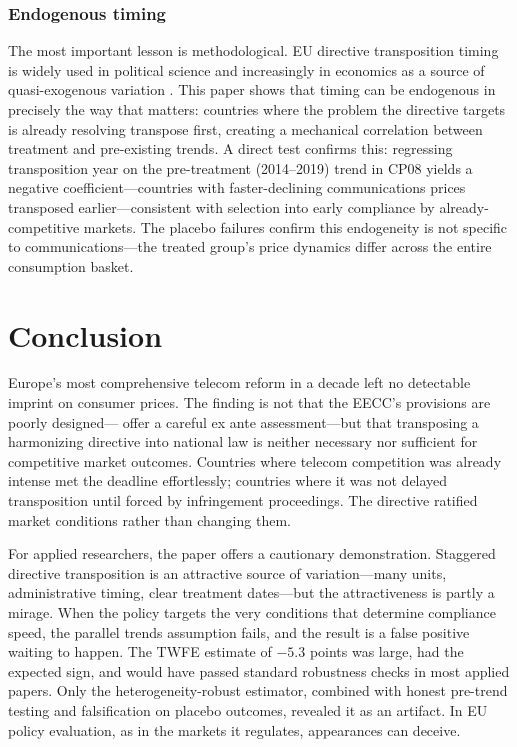 \documentclass[12pt]{article}
\begin{document}
\subsubsection*{Endogenous timing} The most important lesson is methodological. EU directive transposition timing is widely used in political science and increasingly in economics as a source of quasi-exogenous variation \citep{konig2006domestic, thomann2019customizing}. This paper shows that timing can be endogenous in precisely the way that matters: countries where the problem the directive targets is already resolving transpose first, creating a mechanical correlation between treatment and pre-existing trends. A direct test confirms this: regressing transposition year on the pre-treatment (2014--2019) trend in CP08 yields a negative coefficient---countries with faster-declining communications prices transposed earlier---consistent with selection into early compliance by already-competitive markets. The placebo failures confirm this endogeneity is not specific to communications---the treated group's price dynamics differ across the entire consumption basket.

\section{Conclusion}

Europe's most comprehensive telecom reform in a decade left no detectable imprint on consumer prices. The finding is not that the EECC's provisions are poorly designed---\citet{briglauer2017european} offer a careful ex ante assessment---but that transposing a harmonizing directive into national law is neither necessary nor sufficient for competitive market outcomes. Countries where telecom competition was already intense met the deadline effortlessly; countries where it was not delayed transposition until forced by infringement proceedings. The directive ratified market conditions rather than changing them.

For applied researchers, the paper offers a cautionary demonstration. Staggered directive transposition is an attractive source of variation---many units, administrative timing, clear treatment dates---but the attractiveness is partly a mirage. When the policy targets the very conditions that determine compliance speed, the parallel trends assumption fails, and the result is a false positive waiting to happen. The TWFE estimate of $-5.3$ points was large, had the expected sign, and would have passed standard robustness checks in most applied papers. Only the heterogeneity-robust estimator, combined with honest pre-trend testing and falsification on placebo outcomes, revealed it as an artifact. In EU policy evaluation, as in the markets it regulates, appearances can deceive.
\end{document}
